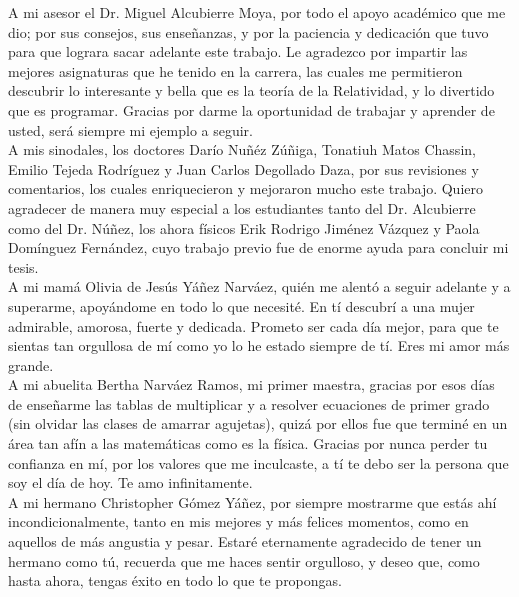 \documentclass[11pt,twoside,openright,spanish]{report}
\numberwithin{equation}{chapter}
\numberwithin{figure}{chapter}
\numberwithin{table}{chapter}
\begin{document}
\begin{acknowledgements}
\noindent
A mi asesor el Dr. Miguel Alcubierre Moya, por todo el apoyo académico que me dio; por sus consejos, sus enseñanzas, y por la paciencia y dedicación que tuvo para que lograra sacar adelante este trabajo. Le agradezco por impartir las mejores asignaturas que he tenido en la carrera, las cuales me permitieron descubrir lo interesante y bella que es la teoría de la Relatividad, y lo divertido que es programar. Gracias por darme la oportunidad de trabajar y aprender de usted, será siempre mi ejemplo a seguir.
\\

\noindent
A mis sinodales, los doctores Darío Nuñéz Zúñiga, Tonatiuh Matos Chassin, Emilio Tejeda Rodríguez y Juan Carlos Degollado Daza, por sus revisiones y comentarios, los cuales enriquecieron y mejoraron mucho este trabajo. Quiero agradecer de manera muy especial a los estudiantes tanto del Dr. Alcubierre como del Dr. Núñez, los ahora físicos Erik Rodrigo Jiménez Vázquez y Paola Domínguez Fernández, cuyo trabajo previo fue de enorme ayuda para concluir mi tesis.
\\

\noindent
A mi mamá Olivia de Jesús Yáñez Narváez, quién me alentó a seguir adelante y a superarme, apoyándome en todo lo que necesité. En tí descubrí a una mujer admirable, amorosa, fuerte y dedicada. Prometo ser cada día mejor, para que te sientas tan orgullosa de mí como yo lo he estado siempre de tí. Eres mi amor más grande.
\\

\noindent
A mi abuelita Bertha Narváez Ramos, mi primer maestra, gracias por esos días de enseñarme las tablas de multiplicar y a resolver ecuaciones de primer grado (sin olvidar las clases de amarrar agujetas), quizá por ellos fue que terminé en un área tan afín a las matemáticas como es la física. Gracias por nunca perder tu confianza en mí, por los valores que me inculcaste, a tí te debo ser la persona que soy el día de hoy. Te amo infinitamente.
\\

\noindent
A mi hermano Christopher Gómez Yáñez, por siempre mostrarme que estás ahí incondicionalmente, tanto en mis mejores y más felices momentos, como en aquellos de más angustia y pesar. Estaré eternamente agradecido de tener un hermano como tú, recuerda que me haces sentir orgulloso, y deseo que, como hasta ahora, tengas éxito en todo lo que te propongas.
\\


\end{acknowledgements}
\end{document}
